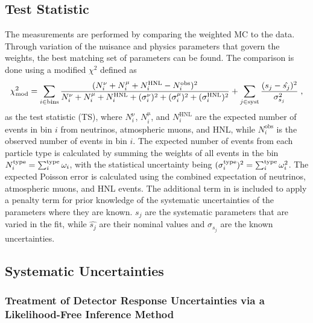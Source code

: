 \subsection{Test Statistic}

The measurements are performed by comparing the weighted MC to the data. Through variation of the nuisance and physics parameters that govern the weights, the best matching set of parameters can be found. The comparison is done using a modified $\chi^2$ defined as
\begin{equation}
    \small
    \chi^2_{\mathrm{mod}} = 
    \sum_{i \in \mathrm{bins}}^{}\frac{(N^{\mathrm{\nu}}_i + N^{\mathrm{\mu}}_i + N^{\mathrm{HNL}}_i - N^{\mathrm{obs}}_i)^2}
    {N^{\mathrm{\nu}}_i + N^{\mathrm{\mu}}_i + N^{\mathrm{HNL}}_i + (\sigma^{\mathrm{\nu}}_i)^2 + (\sigma^{\mathrm{\mu}}_i)^2 + (\sigma^{\mathrm{HNL}}_i)^2}
     + \sum_{j \in \mathrm{syst}}^{}\frac{(s_j - \hat{s_j})^2}{\sigma^2_{s_j}}
    \;,
    \labeq{mod-chi2-hnl}
\end{equation}
as the test statistic (TS), where $N^{\mathrm{\nu}}_i$, $N^{\mathrm{\mu}}_i$, and $N^{\mathrm{HNL}}_i$ are the expected number of events in bin $i$ from neutrinos, atmospheric muons, and HNL, while $N^{\mathrm{obs}}_i$ is the observed number of events in bin $i$. The expected number of events from each particle type is calculated by summing the weights of all events in the bin $N^{\mathrm{type}}_i = \sum_i^\rm{type}\omega_i$, with the statistical uncertainty being $(\sigma^{\mathrm{type}}_i)^2 = \sum_i^\rm{type}\omega_i^2$. The expected Poisson error is calculated using the combined expectation of neutrinos, atmospheric muons, and HNL events. The additional term in  is included to apply a penalty term for prior knowledge of the systematic uncertainties of the parameters where they are known. $s_j$ are the systematic parameters that are varied in the fit, while $\hat{s_j}$ are their nominal values and $\sigma_{s_j}$ are the known uncertainties.


\subsection{Systematic Uncertainties} 


\subsubsection{Treatment of Detector Response Uncertainties via a Likelihood-Free Inference Method} 

